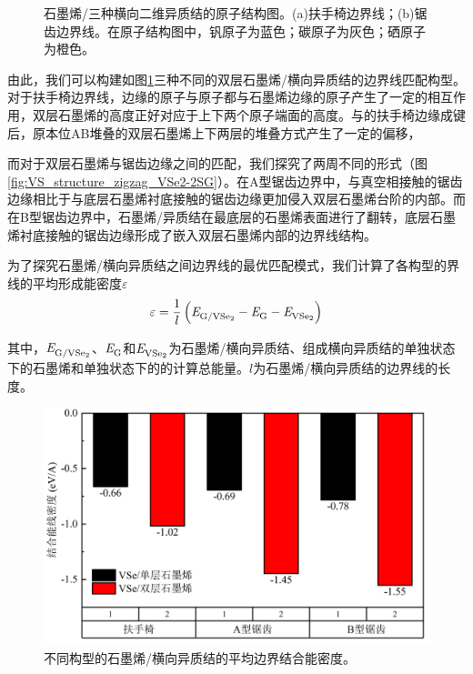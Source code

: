 \begin{figure}[htb]
{            \label{fig:VS_structure_zigzag_VSe2-2SG}
        }
        \caption{石墨烯/三种横向二维异质结的原子结构图。(a)扶手椅边界线；(b)锯齿边界线。在原子结构图中，钒原子为蓝色；碳原子为灰色；硒原子为橙色。}
        \label{fig:VS_structure_ac_zz}
    \end{figure}

    由此，我们可以构建如图\ref{fig:VS_structure_ac_zz}三种不同的双层石墨烯/横向异质结的边界线匹配构型。对于扶手椅边界线，边缘的原子与原子都与石墨烯边缘的原子产生了一定的相互作用，双层石墨烯的高度正好对应于上下两个原子端面的高度。与的扶手椅边缘成键后，原本位AB堆叠的双层石墨烯上下两层的堆叠方式产生了一定的偏移，

    而对于双层石墨烯与锯齿边缘之间的匹配，我们探究了两周不同的形式（图\ref{fig:VS_structure_zigzag_VSe2-2SG}）。在A型锯齿边界中，与真空相接触的锯齿边缘相比于与底层石墨烯衬底接触的锯齿边缘更加侵入双层石墨烯台阶的内部。而在B型锯齿边界中，石墨烯/异质结在最底层的石墨烯表面进行了翻转，底层石墨烯衬底接触的锯齿边缘形成了嵌入双层石墨烯内部的边界线结构。

    为了探究石墨烯/横向异质结之间边界线的最优匹配模式，我们计算了各构型的界线的平均形成能密度$\varepsilon  $\chinesecolon
    \[
        \varepsilon = \frac{1}{l} \left( \energyVar{G/\ce{VSe2}}{} -\energyVar{G}{} -\energyVar{\ce{VSe2}}{} \right)
    \]

    其中，$\energyVar{G/\ce{VSe2}}{}$、$\it E_{\rm G}^{\rm } \it$和$\energyVar{\ce{VSe2}}{}$为石墨烯/横向异质结、组成横向异质结的单独状态下的石墨烯和单独状态下的的计算总能量。$l$为石墨烯/横向异质结的边界线的长度。
    
    \begin{figure}[htb]
        \includegraphics{pic/VS_DFT_VSe2-G_stepAndEdge.png}
        \caption{不同构型的石墨烯/横向异质结的平均边界结合能密度。}
        \label{fig:VS_DFT_VSe2-G_stepAndEdge}
    \end{figure}

